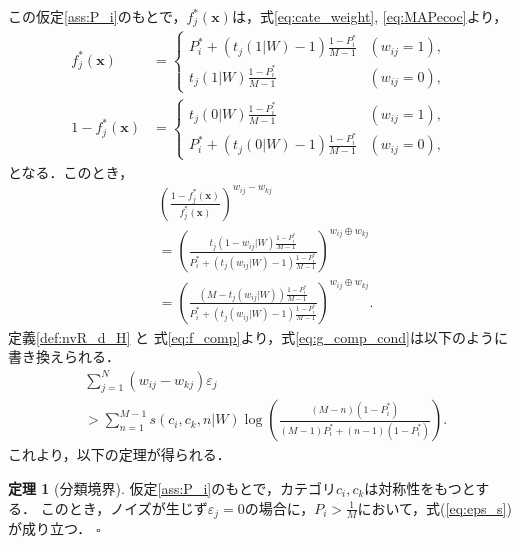 \documentclass{jarticle}
\theoremstyle{definition}
\newtheorem{theorem}{定理}
\def\QED{\hfill$\square$}
\begin{document}
この仮定\ref{ass:P_i}のもとで，$f^*_j(\bm{x})$は，式\eqref{eq:cate_weight}, \eqref{eq:MAPecoc}より，
\begin{align}
    f^*_j(\bm{x})&=\begin{cases}
    P^*_i + \left(t_{j}(1|W) - 1\right)\frac{1-P^*_i}{M-1} & (w_{ij} = 1),\\
    t_{j}(1|W)\frac{1-P^*_i}{M-1}& (w_{ij} = 0),
    \end{cases} \\
    1 - f^*_j(\bm{x})&=\begin{cases}
    t_{j}(0|W)\frac{1-P^*_i}{M-1}& (w_{ij} = 1),\\
    P^*_i + \left(t_{j}(0|W) - 1\right)\frac{1-P^*_i}{M-1}& (w_{ij} = 0),
    \end{cases}
\end{align}
となる．このとき，
\begin{align}\label{eq:f_comp}
     &\left(\frac{1-f^*_j(\bm{x})}{f^*_j(\bm{x})}\right)^{w_{ij}-w_{kj}} \nonumber\\
     &=\left(\frac{t_j(1 - w_{ij}|W)\frac{1-P^*_i}{M-1}}{P^*_i+(t_j(w_{ij}|W)-1)\frac{1-P^*_i}{M-1}}\right)^{w_{ij}\oplus w_{kj}}\nonumber\\
      &=\left(\frac{(M-t_j(w_{ij}|W))\frac{1-P^*_i}{M-1}}{P^*_i+(t_j(w_{ij}|W)-1)\frac{1-P^*_i}{M-1}}\right)^{w_{ij}\oplus w_{kj}}.
\end{align}
定義\ref{def:nvR_d_H} と 式\eqref{eq:f_comp}より，式\eqref{eq:g_comp_cond}は以下のように書き換えられる．
\begin{align}\label{eq:eps_s}
     &\sum_{j = 1}^N (w_{ij} - w_{kj})\varepsilon_j \nonumber\\
     &> \sum_{n = 1}^{M - 1}s(c_i,c_k,n|W)\log\left(\frac{(M - n)(1-P^*_i)}{(M-1)P^*_i+(n-1)(1-P^*_i)}\right).
\end{align}
これより，以下の定理が得られる．
\begin{theorem}[分類境界]\label{th:Symmetric}
仮定\ref{ass:P_i}のもとで，カテゴリ$c_i,c_k$は対称性をもつとする．
このとき，ノイズが生じず$\varepsilon_j=0$の場合に，$P_i>\frac{1}{M}$において，式(\ref{eq:eps_s})が成り立つ．
\QED \end{theorem} 
\end{document}
